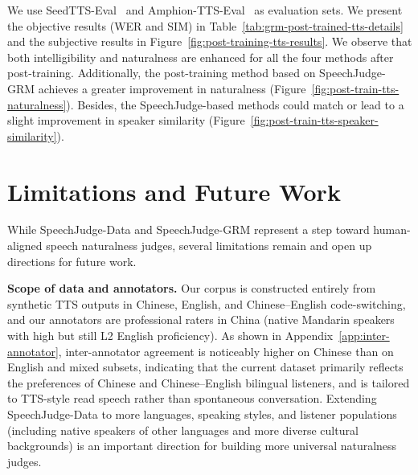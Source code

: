 \documentclass[]{bytedance_seed}
\begin{document}
We use SeedTTS-Eval~\citep{seedtts} and Amphion-TTS-Eval~\citep{intp,amphion,vevo2} as evaluation sets. We present the objective results (WER and SIM) in Table~\ref{tab:grm-post-trained-tts-details} and the subjective results in Figure~\ref{fig:post-training-tts-results}. 
We observe that both intelligibility and naturalness are enhanced for all the four methods after post-training. Additionally, the post-training method based on SpeechJudge-GRM achieves a greater improvement in naturalness (Figure~\ref{fig:post-train-tts-naturalness}). Besides, the SpeechJudge-based methods could match or lead to a slight improvement in speaker similarity (Figure~\ref{fig:post-train-tts-speaker-similarity}).

\section{Limitations and Future Work}
\label{sec:limitations}

While SpeechJudge-Data and SpeechJudge-GRM represent a step toward
human-aligned speech naturalness judges, several limitations remain and open
up directions for future work.

\textbf{Scope of data and annotators.}\quad
Our corpus is constructed entirely from synthetic TTS outputs in Chinese,
English, and Chinese--English code-switching, and our annotators are
professional raters in China (native Mandarin speakers with high but still L2
English proficiency).
As shown in Appendix~\ref{app:inter-annotator}, inter-annotator agreement is noticeably higher on
Chinese than on English and mixed subsets, indicating that the current
dataset primarily reflects the preferences of Chinese and Chinese--English
bilingual listeners, and is tailored to TTS-style read speech rather than
spontaneous conversation.
Extending SpeechJudge-Data to more languages, speaking styles, and listener
populations (including native speakers of other languages and more diverse
cultural backgrounds) is an important direction for building more universal
naturalness judges.
\end{document}

